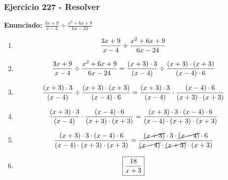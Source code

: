 \documentclass[11pt,a4paper]{article}
\newcommand{\fitmath}[1]{%
\[
\setbox0=\hbox{$\displaystyle #1$}%
\ifdim\wd0>\linewidth
\resizebox{\linewidth}{!}{$\displaystyle #1$}%
\else
#1%
\fi
\]
}
\begin{document}
\subsubsection*{Ejercicio 227 - Resolver}
\textbf{Enunciado:} $ \frac{3 x + 9}{x - 4} \div \frac{x^{2} + 6 x + 9}{6 x - 24} $\par
\begin{enumerate}[leftmargin=2em]
\item \fitmath{\frac{3 x + 9}{x - 4} \div \frac{x^{2} + 6 x + 9}{6 x - 24}}
\item \fitmath{\frac{3 x + 9}{x - 4} \div \frac{x^{2} + 6 x + 9}{6 x - 24}= \frac{\left(x + 3\right)\cdot 3}{\left(x - 4\right)} \div \frac{\left(x + 3\right)\cdot \left(x + 3\right)}{\left(x - 4\right)\cdot 6}}
\item \fitmath{\frac{\left(x + 3\right)\cdot 3}{\left(x - 4\right)}\div \frac{\left(x + 3\right)\cdot \left(x + 3\right)}{\left(x - 4\right)\cdot 6}= \frac{\left(x + 3\right)\cdot 3}{\left(x - 4\right)}\cdot \frac{\left(x - 4\right)\cdot 6}{\left(x + 3\right)\cdot \left(x + 3\right)}}
\item \fitmath{\frac{\left(x + 3\right)\cdot 3}{\left(x - 4\right)}\cdot \frac{\left(x - 4\right)\cdot 6}{\left(x + 3\right)\cdot \left(x + 3\right)}= \frac{\left(x + 3\right)\cdot 3\cdot \left(x - 4\right)\cdot 6}{\left(x - 4\right)\cdot \left(x + 3\right)\cdot \left(x + 3\right)}}
\item \fitmath{\frac{\left(x + 3\right)\cdot 3\cdot \left(x - 4\right)\cdot 6}{\left(x - 4\right)\cdot \left(x + 3\right)\cdot \left(x + 3\right)}= \frac{\cancel{\left(x + 3\right)}\cdot 3\cdot \cancel{\left(x - 4\right)}\cdot 6}{\cancel{\left(x - 4\right)}\cdot \cancel{\left(x + 3\right)}\cdot \left(x + 3\right)}}
\item \fitmath{\boxed{\frac{18}{x + 3}}}
\end{enumerate}

\vspace{0.12cm}
\end{document}
